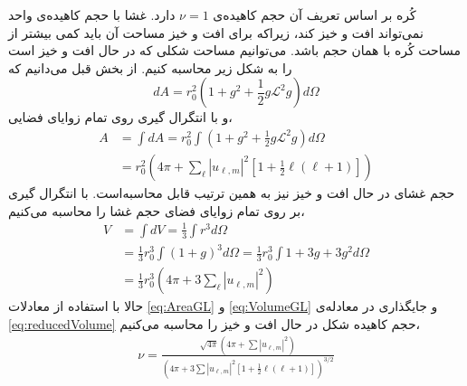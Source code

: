 
 کُره‌ بر اساس تعریف آن حجم کاهیده‌ی 
 $\nu=1$
 دارد. غشا با حجم کاهیده‌ی واحد نمی‌تواند افت و خیز کند، زیراکه برای افت و خیز مساحت آن باید کمی بیشتر از مساحت کُره با همان حجم باشد. می‌توانیم مساحت شکلی که در حال افت و خیز است را به شکل زیر محاسبه کنیم. از بخش قبل می‌دانیم که
\begin{equation}
dA=r_{0}^2(1+g^2+\frac{1}{2}g\mathcal{L}^2g)d\Omega
\label{eq:areaPatchDifferential}
\end{equation}
 و با انتگرال گیری روی تمام زوایای فضایی،
 \begin{equation}
\begin{aligned}
A&=\int dA=r_{0}^2\int(1+g^2+\frac{1}{2}g\mathcal{L}^2g)d\Omega\\
&=r_{0}^2(4\pi+\sum_{\ell}|u_{\ell,m}|^2[1+\frac{1}{2}\ell(\ell+1)])
\label{eq:AreaGL}
\end{aligned}
\end{equation}
 حجم غشای در حال افت و خیز نیز به همین ترتیب قابل محاسبه‌است. با انتگرال گیری بر روی تمام زوایای فضای حجم غشا را محاسبه می‌کنیم،
\begin{equation}
\begin{aligned}
V&=\int dV=\frac{1}{3}\int r^3d\Omega\\
&=\frac{1}{3}r_{0}^3\int(1+g)^3d\Omega=\frac{1}{3}r_{0}^3\int1+3g+3g^2d\Omega\\
&=\frac{1}{3}r_{0}^3(4\pi+3\sum_{\ell}|u_{\ell,m}|^2)
\label{eq:VolumeGL}
\end{aligned}
\end{equation}
حالا با استفاده از معادلات
\ref{eq:AreaGL}
و
\ref{eq:VolumeGL}
و جایگذاری در معادله‌ی
\ref{eq:reducedVolume}
حجم کاهیده شکل در حال افت و خیز  را محاسبه می‌کنیم،
\begin{equation}
\begin{aligned}
\nu=\frac{\sqrt{4\pi}(4\pi+\sum|u_{\ell,m}|^2)}{(4\pi+3\sum|u_{\ell,m}|^2[1+\frac{1}{2}\ell(\ell+1)])^{3/2}}
\label{eq:nuUndulated}
\end{aligned}
\end{equation}
